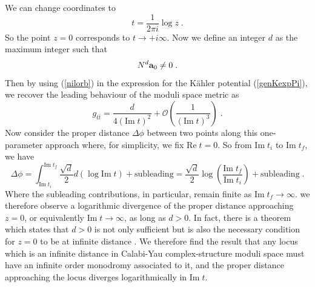 \documentclass[11pt,a4paper]{article}
\numberwithin{equation}{section}
\numberwithin{table}{section}\setlength{\multlinegap}{25pt}
\newcommand{\cO}{\mathcal{O}}
\newcommand{\be}{\begin{equation}}
\newcommand{\ee}{\end{equation}}
\begin{document}
We can change coordinates to 
\be
t = \frac{1}{2\pi i} \log z \;.
\ee
So the point $z=0$ corresponds to $t \rightarrow +i\infty$.
Now we define an integer $d$ as the maximum integer such that
\be
N^d {\bf a}_0 \neq 0 \;. 
\ee
Then by using (\ref{nilorb}) in the expression for the K{\"a}hler potential (\ref{genKexpPi}), we recover the leading behaviour of the moduli space metric as
\be
g_{t\bar{t}} = \frac{d}{4\left(\mathrm{Im\;} t\right)^2}  + \cO\left( \frac{1}{\left(\mathrm{Im\;} t\right)^3} \right)\;.
\ee
Now consider the proper distance $\Delta \phi$ between two points along this one-parameter approach where, for simplicity, we fix $\mathrm{Re\;} t=0$. So from $\mathrm{Im\;} t_i$ to $ \mathrm{Im\;} t_f$, we have
\be
\Delta \phi = \int_{\mathrm{Im\;} t_i}^{ \mathrm{Im\;} t_f} \frac{\sqrt{d}}{2} d \left( \log  \mathrm{Im\;} t \right)+ \mathrm{subleading} = \frac{\sqrt{d}}{2} \log \left(\frac{ \mathrm{Im\;} t_f}{ \mathrm{Im\;} t_i} \right) + \mathrm{subleading}  \;.
\ee
Where the subleading contributions, in particular, remain finite as $ \mathrm{Im\;} t_f \rightarrow \infty$. we therefore observe a logarithmic divergence of the proper distance approaching $z=0$, or equivalently $\mathrm{Im\;} t \rightarrow \infty$, as long as $d > 0$. In fact, there is a theorem which states that $d>0$ is not only sufficient but is also the necessary condition for $z=0$ to be at infinite distance \cite{wang1}. We therefore find the result that any locus which is an infinite distance in Calabi-Yau complex-structure moduli space must have an infinite order monodromy associated to it, and the proper distance approaching the locus diverges logarithmically in $\mathrm{Im\;}t$. 
\end{document}
